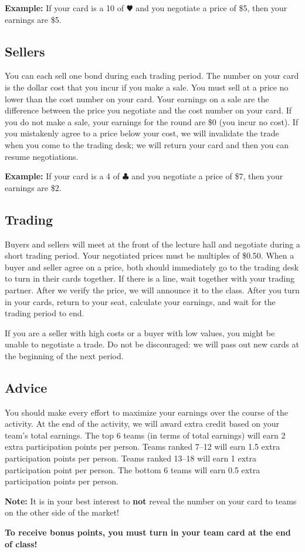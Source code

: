 \documentclass[12pt]{article}
\begin{document}
	\bigskip
	
	\noindent \textbf{Example:} If your card is a 10 of $\varheartsuit$ and you negotiate a price of \$5, then your earnings are \$5.
	
	\subsection*{Sellers} 
	
	You can each sell one bond during each trading period. The number on your card is the dollar cost that you incur if you make a sale. You must sell at a price no lower than the cost number on your card. Your earnings on a sale are the difference between the price you negotiate and the cost number on your card. If you do not make a sale, your earnings for the round are \$0 (you incur no cost). If you mistakenly agree to a price below your cost, we will invalidate the trade when you come to the trading desk; we will return your card and then you can resume negotiations. 
	
	\bigskip
	
	\noindent \textbf{Example:} If your card is a 4 of $\clubsuit$ and you negotiate a price of \$7, then your earnings are \$2.
	
	\newpage
	
	\subsection*{Trading} Buyers and sellers will meet at the front of the lecture hall and negotiate during a short trading period. Your negotiated prices must be multiples of \$0.50. When a buyer and seller agree on a price, both should immediately go to the trading desk to turn in their cards together. If there is a line, wait together with your trading partner. After we verify the price, we will announce it to the class. After you turn in your cards, return to your seat, calculate your earnings, and wait for the trading period to end. 
	
	\bigskip
	
	\noindent If you are a seller with high costs or a buyer with low values, you might be unable to negotiate a trade. Do not be discouraged: we will pass out new cards at the beginning of the next period.
	
	\subsection*{Advice} You should make every effort to maximize your earnings over the course of the activity. At the end of the activity, we will award extra credit based on your team's total earnings. The top 6 teams (in terms of total earnings) will earn 2 extra participation points per person. Teams ranked 7--12 will earn 1.5 extra participation points per person. Teams ranked 13--18 will earn 1 extra participation point per person. The bottom 6 teams will earn 0.5 extra participation points per person. 
	
	\bigskip
	
	\noindent \textbf{Note:} It is in your best interest to \textbf{not} reveal the number on your card to teams on the other side of the market! 
	
	\bigskip
	
	\noindent \textbf{To receive bonus points, you must turn in your team card at the end of class!}
	
\end{document}
